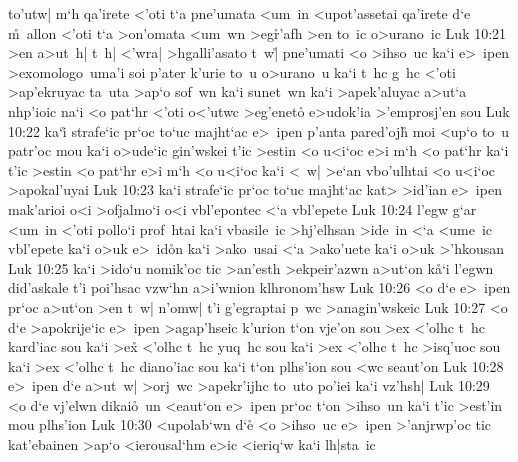 to'utw|
m`h
qa'irete
<'oti
t`a
pne'umata
<um~in
<upot'assetai
qa'irete
d`e
\r{m}~allon
<'oti
t`a
>on'omata
<um~wn
>eg\r{r}'afh
>en
to~ic
o>urano~ic\bibvsend
\vs Luk 10:21
>en
a>ut~h|
t~h|
<'wra|
>hgalli'asato
t~w|\r{}
pne'umati
<o
>ihso~uc
ka`i
e>~ipen
>exomologo~uma'i
soi
p'ater
k'urie
to~u
o>urano~u
ka`i
t~hc
g~hc
<'oti
>ap'ekruyac
ta~uta
>ap`o
sof~wn
ka`i
sunet~wn
ka`i
>apek'aluyac
a>ut`a
nhp'ioic
na`i
<o
pat`hr
<'oti
o<'utwc
>eg'eneto\r{}
e>udok'ia
>'emprosj'en
sou\bibvsend
\vs Luk 10:22
ka`i\r{}
strafe`ic
pr`oc
to`uc
majht`ac
e>~ipen
p'anta
pared'ojh\r{}
moi
<up`o
to~u
patr'oc
mou
ka`i
o>ude`ic
gin'wskei
t'ic
>estin
<o
u<i`oc
e>i
m`h
<o
pat`hr
ka`i
t'ic
>estin
<o
pat`hr
e>i
m`h
<o
u<i`oc
ka`i
<~w|
>e`an
vbo'ulhtai
<o
u<i`oc
>apokal'uyai\bibvsend
\vs Luk 10:23
ka`i
strafe`ic
pr`oc
to`uc
majht`ac
kat>
>id'ian
e>~ipen
mak'arioi
o<i
>ofjalmo`i
o<i
vbl'epontec
<`a
vbl'epete\bibvsend
\vs Luk 10:24
l'egw
g`ar
<um~in
<'oti
pollo`i
prof~htai
ka`i
vbasile~ic
>hj'elhsan
>ide~in
<`a
<ume~ic
vbl'epete
ka`i
o>uk
e>~id\r{o}n
ka`i
>ako~usai
<`a
>ako'uete
ka`i
o>uk
>'hkousan\bibvsend
\vs Luk 10:25
ka`i
>ido`u
nomik'oc
tic
>an'esth
>ekpeir'azwn
a>ut`on
k\r{a}`i
l'egwn
did'askale
t'i
poi'hsac
vzw`hn
a>i'wnion
klhronom'hsw\bibvsend
\vs Luk 10:26
<o
d`e
e>~ipen
pr`oc
a>ut`on
>en
t~w|
n'omw|
t'i
g'egraptai
p~wc
>anagin'wskeic\bibvsend
\vs Luk 10:27
<o
d`e
>apokrije`ic
e>~ipen
>agap'hseic
k'urion
t`on
vje'on
sou
>ex
<'olhc
t~hc
kard'iac
sou
ka`i
>ex\r{}
<'olhc
t~hc
yuq~hc
sou
ka`i
>ex
<'olhc
t~hc
>isq'uoc
sou
ka`i
>ex
<'olhc
t~hc
diano'iac
sou
ka`i
t`on
plhs'ion
sou
<wc
seaut'on\bibvsend
\vs Luk 10:28
e>~ipen
d`e
a>ut~w|
>orj~wc
>apekr'ijhc
to~uto
po'iei
ka`i
vz'hsh|\bibvsend
\vs Luk 10:29
<o
d`e
vj'elwn
dikai\r{o}~un
<eaut`on
e>~ipen
pr`oc
t`on
>ihso~un
ka`i
t'ic
>est'in
mou
plhs'ion\bibvsend
\vs Luk 10:30
<upolab`wn
d`e\r{}
<o
>ihso~uc
e>~ipen
>'anjrwp'oc
tic
kat'ebainen
>ap`o
<ierousal`hm
e>ic
<ieriq`w
ka`i
lh|sta~ic
